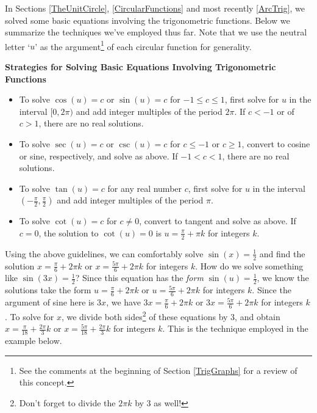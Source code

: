 



\setcounter{footnote}{0}

\label{TrigEquIneq}

In Sections \ref{TheUnitCircle}, \ref{CircularFunctions} and most recently \ref{ArcTrig}, we solved some basic equations involving the trigonometric functions. Below we summarize the techniques we've employed thus far.  Note that we use the neutral letter `$u$' as the argument\footnote{See the comments at the beginning of Section \ref{TrigGraphs} for a review of this concept.} of each circular function for generality.

\smallskip

\label{trigeqnstrategy1}

\colorbox{ResultColor}{\bbm
\centerline{\textbf{Strategies for Solving Basic Equations Involving Trigonometric Functions}}

\smallskip

\begin{itemize}

\item To solve $\cos(u) = c$ or $\sin(u) = c$ for $-1 \leq c \leq 1$, first solve for $u$ in the interval $[0,2\pi)$ and add integer multiples of the period $2\pi$.  If $c < -1$ or of $c > 1$, there are no real solutions.

\item To solve $\sec(u) = c$ or $\csc(u) = c$ for $c \leq -1$ or $c \geq 1$,  convert to cosine or sine, respectively, and solve as above.  If $-1 < c < 1$, there are no real solutions.

\item To solve  $\tan(u) = c$ for any real number $c$,  first solve for $u$ in the interval $\left(-\frac{\pi}{2}, \frac{\pi}{2}\right)$ and add integer multiples of the period $\pi$.

\item  To solve  $\cot(u) = c$ for $c \neq 0$, convert to tangent and solve as above.  If $c = 0$, the solution to $\cot(u) = 0$ is $u = \frac{\pi}{2} + \pi k$ for integers $k$.

\end{itemize}

\ebm}

\smallskip

Using the above guidelines, we can comfortably solve $\sin(x) = \frac{1}{2}$ and find the solution $x = \frac{\pi}{6} + 2\pi k$ or $x = \frac{5\pi}{6} + 2\pi k$ for integers $k$. How do we solve something like $\sin(3x) = \frac{1}{2}$?  Since this equation has the \textit{form} $\sin(u) = \frac{1}{2}$, we know the solutions take the form  $u= \frac{\pi}{6} + 2\pi k$ or $u = \frac{5\pi}{6} + 2\pi k$ for integers $k$. Since the argument of sine here is $3x$, we have $3x= \frac{\pi}{6} + 2\pi k$ or $3x = \frac{5\pi}{6} + 2\pi k$ for integers $k$. To solve for $x$, we divide both sides\footnote{Don't forget to divide the $2\pi k$ by $3$ as well!} of these equations by $3$, and obtain $x = \frac{\pi}{18} + \frac{2\pi}{3} k$ or $x = \frac{5\pi}{18} + \frac{2\pi}{3}k$ for integers $k$.  This is the technique employed in the example below.

